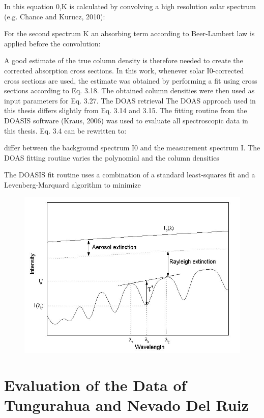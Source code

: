 \documentclass  [
  paper    = a4,
  BCOR     = 10mm,
  twoside,
  fontsize = 12pt,
  fleqn,
  toc      = bibnumbered,
  toc      = listofnumbered,
  numbers  = noendperiod,
  headings = normal,
  listof   = leveldown,
  version  = 3.03
]                                       {scrreprt}
\begin{document}
	In this equation 
	0,K is calculated by convolving a high resolution solar spectrum
	(e.g. Chance and Kurucz, 2010):

	For the second spectrum 
	K an absorbing term according to Beer-Lambert law
	is applied before the convolution:

	A good estimate of the true column density is therefore needed to create the
	corrected absorption cross sections. In this work, whenever solar I0-corrected
	cross sections are used, the estimate was obtained by performing a fit using cross
	sections according to Eq. 3.18. The obtained column densities were then used as
	input parameters for Eq. 3.27.
	The DOAS retrieval
	The DOAS approach used in this thesis differs slightly from Eq. 3.14 and 3.15.
	The fitting routine from the DOASIS software (Kraus, 2006) was used to evaluate
	all spectroscopic data in this thesis.
	Eq. 3.4 can be rewritten to:

	differ between the background spectrum I0 and the measurement spectrum I.
	The DOAS fitting routine varies the polynomial and the column densities

	The DOASIS fit routine uses a combination of a standard least-squares fit and a
	Levenberg-Marquard algorithm to minimize 
	\begin{figure}
		\centering
		\includegraphics[width=0.7\linewidth]{Bilder/Simon/Bilder_Tung/DOAS_Intensity}
		\caption{}
		\label{fig:doasintensity}
	\end{figure}
	
	\part{Evaluation of the Data of Tungurahua and Nevado Del Ruiz}
	
	
\end{document}
